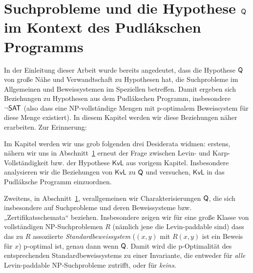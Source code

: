 \chapter{Suchprobleme und die Hypothese $\mathsf{Q}$ im Kontext des Pudlákschen Programms}


In der Einleitung dieser Arbeit wurde bereits angedeutet, dass die Hypothese $\mathsf{Q}$ von \citeauthor{fenner_inverting_2003} große Nähe und Verwandtschaft zu Hypothesen hat, die Suchprobleme im Allgemeinen und Beweissystemen im Speziellen betreffen. Damit ergeben sich Beziehungen zu Hypothesen aus dem Pudlákschen Programm, insbesondere $\neg\mathsf{SAT}$ (also dass eine NP-vollständige Mengen mit p-optimalem Beweissystem für diese Menge existiert).
In diesem Kapitel werden wir diese Beziehungen näher erarbeiten. Zur Erinnerung:

\conjq*

Im Kapitel werden wir uns grob folgenden drei Desiderata widmen: 
erstens, nähern wir uns in Abschnitt~\ref{} erneut der Frage zwischen Levin- und Karp-Vollständigkeit bzw. der Hypothese $\mathsf{KvL}$ aus vorigem Kapitel. Insbesondere analysieren wir die Beziehungen von $\mathsf{KvL}$ zu $\mathsf{Q}$ und versuchen, $\mathsf{KvL}$ in das Pudláksche Programm einzuordnen.

Zweitens, in Abschnitt~\ref{}, verallgemeinen wir Charakterisierungen $\mathsf{Q}$, die sich insbesondere auf Suchprobleme und deren Beweissysteme bzw. „Zertifikatsschemata“ beziehen.
Insbesondere zeigen wir für eine große Klasse von vollständigen NP-Suchproblemen $R$ (nämlich jene die Levin-paddable sind) dass das zu $R$ assoziierte \emph{Standardbeweissystem} ($(x,y)$ mit $R(x,y)$ ist ein Beweis für $x$) p-optimal ist, genau dann wenn $\mathsf{Q}$. Damit wird die p-Optimalität des entsprechenden Standardbeweissystems zu einer Invariante, die entweder für \emph{alle} Levin-paddable NP-Suchprobleme zutrifft, oder für \emph{keins}.



